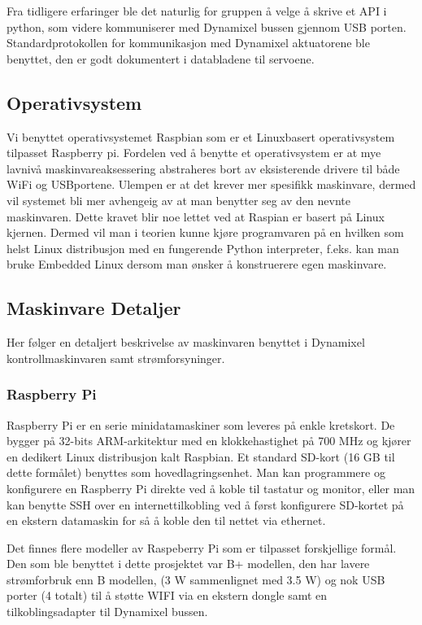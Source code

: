 \documentclass[12pt]{report}
\begin{document}
Fra tidligere erfaringer ble det naturlig for gruppen å velge å skrive et API i python, som videre kommuniserer med Dynamixel bussen gjennom USB porten. Standardprotokollen for kommunikasjon med Dynamixel aktuatorene ble benyttet, den er godt dokumentert i databladene til servoene\cite{Dynamixel}. 

\subsection{Operativsystem}
Vi benyttet operativsystemet Raspbian som er et Linuxbasert operativsystem tilpasset Raspberry pi. Fordelen ved å benytte et operativsystem er at mye lavnivå maskinvareaksessering abstraheres bort av eksisterende drivere til både WiFi og USBportene. Ulempen er at det krever mer spesifikk maskinvare, dermed vil systemet bli mer avhengeig av at man benytter seg av den nevnte maskinvaren. Dette kravet blir noe lettet ved at Raspian er basert på Linux kjernen. Dermed vil man i teorien kunne kjøre programvaren på en hvilken som helst Linux distribusjon med en fungerende Python interpreter, f.eks. kan man bruke Embedded Linux dersom man ønsker å konstruerere egen maskinvare.

\subsection{Maskinvare Detaljer}
Her følger en detaljert beskrivelse av maskinvaren benyttet i Dynamixel kontrollmaskinvaren samt strømforsyninger.

\subsubsection{Raspberry Pi}Raspberry Pi er en serie minidatamaskiner som leveres på enkle kretskort. De bygger på 32-bits ARM-arkitektur med en klokkehastighet på 700 MHz og kjører en dedikert Linux distribusjon kalt Raspbian. Et standard SD-kort (16 GB til dette formålet) benyttes som hovedlagringsenhet. Man kan programmere og konfigurere en Raspberry Pi direkte ved å koble til tastatur og monitor, eller man kan benytte SSH over en internettilkobling ved å først konfigurere SD-kortet på en ekstern datamaskin for så å koble den til nettet via ethernet.

Det finnes flere modeller av Raspeberry Pi som er tilpasset forskjellige formål. Den som ble benyttet i dette prosjektet var B+ modellen, den har lavere strømforbruk enn B modellen, (3 W sammenlignet med 3.5 W) og nok USB porter (4 totalt) til å støtte WIFI via en ekstern dongle samt en tilkoblingsadapter til Dynamixel bussen. 
\end{document}
